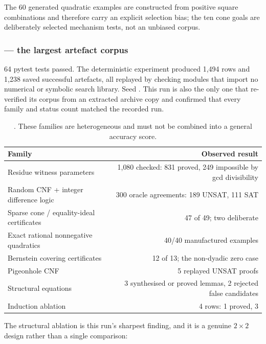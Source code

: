 The 60 generated quadratic examples are constructed from positive square
combinations and therefore carry an explicit selection bias; the ten cone goals
are deliberately selected mechanism tests, not an unbiased corpus.

\subsubsection*{ --- the largest artefact corpus}

64 pytest tests passed. The deterministic experiment produced 1{,}494 rows and
1{,}238 saved successful artefacts, all replayed by checking modules that import
no numerical or symbolic search library. Seed . This run is also
the only one that re-verified its corpus from an extracted archive copy and
confirmed that every family and status count matched the recorded run.

\begin{table}[htbp]
\centering\small
\begin{tabular}{@{}lr@{}}
\toprule
Family & Observed result \\
\midrule
Residue witness parameters & 1{,}080 checked: 831 proved, 249 impossible by gcd divisibility \\
Random CNF + integer difference logic & 300 oracle agreements: 189 UNSAT, 111 SAT \\
Sparse cone / equality-ideal certificates & 47 of 49; two deliberate \unknown{} \\
Exact rational nonnegative quadratics & 40/40 manufactured examples \\
Bernstein covering certificates & 12 of 13; the non-dyadic zero case \unknown{} \\
Pigeonhole CNF & 5 replayed UNSAT proofs \\
Structural equations & 3 synthesised or proved lemmas, 2 rejected false candidates \\
Induction ablation & 4 rows: 1 proved, 3 \unknown{} \\
\bottomrule
\end{tabular}
\caption{. These families are heterogeneous and must not be combined
into a general accuracy score.}
\label{tab:p4}
\end{table}

The structural ablation is this run's sharpest finding, and it is a genuine
$2\times2$ design rather than a single comparison:

